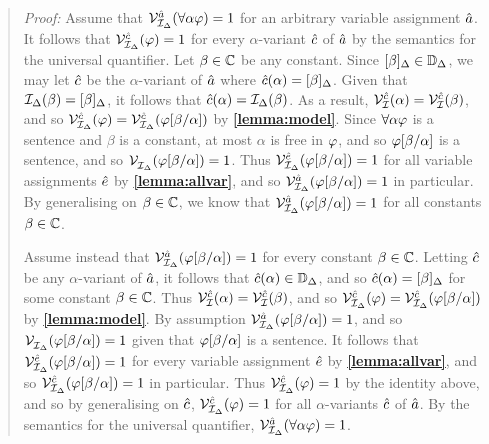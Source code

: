 \begin{quote} 
  \textit{Proof:}
  Assume that $\mathcal{V}_{\mathcal{I}_\Delta}^{\hat{a}}(\forall \alpha\varphi)=1$ for an arbitrary variable assignment $\hat{a}$.
  It follows that $\mathcal{V}_{\mathcal{I}_\Delta}^{\hat{c}}(\varphi)=1$ for every $\alpha$-variant $\hat{c}$ of $\hat{a}$ by the semantics for the universal quantifier.
  Let $\beta\in\mathbb{C}$ be any constant. 
  Since $[\beta]_\Delta\in\mathbb{D}_\Delta$, we may let $\hat{c}$ be the $\alpha$-variant of $\hat{a}$ where $\hat{c}(\alpha)=[\beta]_\Delta$.
  Given that $\mathcal{I}_\Delta(\beta)=[\beta]_\Delta$, it follows that $\hat{c}(\alpha)=\mathcal{I}_\Delta(\beta)$.
  As a result, $\mathcal{V}_{\mathcal{I}}^{\hat{c}}(\alpha)=\mathcal{V}_{\mathcal{I}}^{\hat{c}}(\beta)$, and so $\mathcal{V}_{\mathcal{I}_\Delta}^{\hat{c}}(\varphi)=\mathcal{V}_{\mathcal{I}_\Delta}^{\hat{c}}(\varphi[\beta/\alpha])$ by \textbf{\ref{lemma:model}}.
  Since $\forall \alpha\varphi$ is a sentence and $\beta$ is a constant, at most $\alpha$ is free in $\varphi$, and so $\varphi[\beta/\alpha]$ is a sentence, and so $\mathcal{V}_{\mathcal{I}_\Delta}^{}(\varphi[\beta/\alpha])=1$.
  Thus $\mathcal{V}_{\mathcal{I}_\Delta}^{\hat{e}}(\varphi[\beta/\alpha])=1$ for all variable assignments $\hat{e}$ by \textbf{\ref{lemma:allvar}}, and so $\mathcal{V}_{\mathcal{I}_\Delta}^{\hat{a}}(\varphi[\beta/\alpha])=1$ in particular.
  By generalising on $\beta\in\mathbb{C}$, we know that $\mathcal{V}_{\mathcal{I}_\Delta}^{\hat{a}}(\varphi[\beta/\alpha])=1$ for all constants $\beta\in\mathbb{C}$.

  Assume instead that $\mathcal{V}_{\mathcal{I}_\Delta}^{\hat{a}}(\varphi[\beta/\alpha])=1$ for every constant $\beta\in\mathbb{C}$.
  Letting $\hat{c}$ be any $\alpha$-variant of $\hat{a}$, it follows that $\hat{c}(\alpha)\in\mathbb{D}_\Delta$, and so $\hat{c}(\alpha)=[\beta]_\Delta$ for some constant $\beta\in\mathbb{C}$.
  Thus $\mathcal{V}_{\mathcal{I}}^{\hat{c}}(\alpha)=\mathcal{V}_{\mathcal{I}}^{\hat{c}}(\beta)$, and so $\mathcal{V}_{\mathcal{I}_\Delta}^{\hat{c}}(\varphi)=\mathcal{V}_{\mathcal{I}_\Delta}^{\hat{c}}(\varphi[\beta/\alpha])$ by \textbf{\ref{lemma:model}}.
  By assumption $\mathcal{V}_{\mathcal{I}_\Delta}^{\hat{a}}(\varphi[\beta/\alpha])=1$, and so $\mathcal{V}_{\mathcal{I}_\Delta}^{}(\varphi[\beta/\alpha])=1$ given that $\varphi[\beta/\alpha]$ is a sentence.
  It follows that $\mathcal{V}_{\mathcal{I}_\Delta}^{\hat{e}}(\varphi[\beta/\alpha])=1$ for every variable assignment $\hat{e}$ by \textbf{\ref{lemma:allvar}}, and so $\mathcal{V}_{\mathcal{I}_\Delta}^{\hat{c}}(\varphi[\beta/\alpha])=1$ in particular. 
  Thus $\mathcal{V}_{\mathcal{I}_\Delta}^{\hat{c}}(\varphi)=1$ by the identity above, and so by generalising on $\hat{c}$, $\mathcal{V}_{\mathcal{I}_\Delta}^{\hat{c}}(\varphi)=1$ for all $\alpha$-variants $\hat{c}$ of $\hat{a}$.
  By the semantics for the universal quantifier, $\mathcal{V}_{\mathcal{I}_\Delta}^{\hat{a}}(\forall \alpha\varphi)=1$. 
\end{quote}






